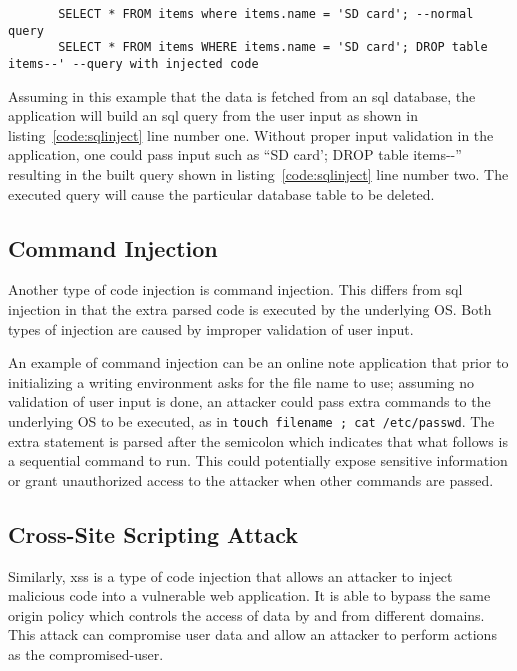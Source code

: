 \begin{code}
    \begin{verbatim}
       SELECT * FROM items where items.name = 'SD card'; --normal query
       SELECT * FROM items WHERE items.name = 'SD card'; DROP table items--' --query with injected code
    \end{verbatim}
\label{code:sqlinject}
\end{code}

Assuming in this example that the data is fetched from an \gls{sql} database, the application will build an \gls{sql} query from the user input as shown in listing~\ref{code:sqlinject} line number one.
Without proper input validation in the application, one could pass input such as ``SD card'; DROP table items-\phantom{}-'' resulting in the built query shown in listing~\ref{code:sqlinject} line number two.
The executed query will cause the particular database table to be deleted.

\subsection{Command Injection}\label{subsec:command-injection}
Another type of code injection is command injection.
This differs from \gls{sql} injection in that the extra parsed code is executed by the underlying OS.
Both types of injection are caused by improper validation of user input.

An example of command injection can be an online note application that prior to initializing a writing environment asks for the file name to use;
assuming no validation of user input is done, an attacker could pass extra commands to the underlying OS to be executed, as in
\texttt{touch filename ; cat /etc/passwd}.
The extra statement is parsed after the semicolon which indicates that what follows is a sequential command to run.
This could potentially expose sensitive information or grant unauthorized access to the attacker when other commands are passed.

\subsection{Cross-Site Scripting Attack}\label{subsec:xss}
Similarly, \gls{xss} is a type of code injection that allows an attacker to inject malicious code into a vulnerable web application.
It is able to bypass the same origin policy which controls the access of data by and from different domains.
This attack can compromise user data and allow an attacker to perform actions as the compromised-user. \cite{portswigger}

